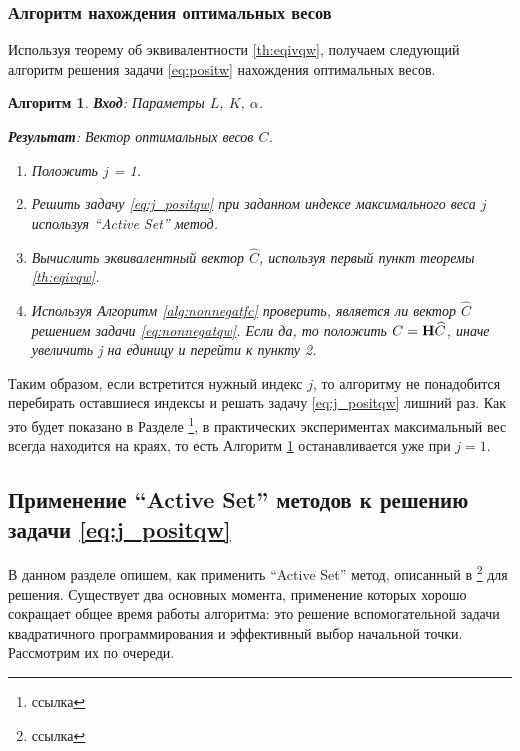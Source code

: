 \documentclass[12pt,a4paper]{article}
\newtheorem{algorithm}{Алгоритм}
\begin{document}
\subsubsection{Алгоритм нахождения оптимальных весов}
Используя теорему об эквивалентности \ref{th:eqivqw}, получаем следующий алгоритм решения задачи \eqref{eq:positw} нахождения оптимальных весов.
\begin{algorithm}
	\label{alg:solveqw}
	\textbf{Вход}: Параметры $L$, $K$, $\alpha$.
	
	\textbf{Результат}:
	Вектор оптимальных весов $C$.
	
	\begin{enumerate}
		\item Положить $j$ = 1.
		\item Решить задачу \eqref{eq:j_positqw} при заданном индексе максимального веса $j$ используя ``Active Set'' метод.
		\item Вычислить эквивалентный вектор $\widehat C$, используя первый пункт теоремы \ref{th:eqivqw}.
		\item Используя Алгоритм \ref{alg:nonnegatfc} проверить, является ли вектор $\widehat C$ решением задачи \eqref{eq:nonnegatqw}. Если да, то положить $C = \mathbf{H} \widehat C$, иначе увеличить j на единицу и перейти к пункту 2.
	\end{enumerate}
\end{algorithm}

Таким образом, если встретится нужный индекс $j$, то алгоритму не понадобится перебирать оставшиеся индексы и решать задачу \eqref{eq:j_positqw} лишний раз. Как это будет показано в Разделе \footnote{ссылка}, в практических экспериментах максимальный вес всегда находится на краях, то есть Алгоритм \ref{alg:solveqw} останавливается уже при $j = 1$.

\subsection{Применение ``Active Set'' методов к решению задачи \eqref{eq:j_positqw}}
В данном разделе опишем, как применить ``Active Set'' метод, описанный в \footnote{ссылка} для решения. Существует два основных момента, применение которых хорошо сокращает общее время работы алгоритма: это решение вспомогательной задачи квадратичного программирования и эффективный выбор начальной точки. Рассмотрим их по очереди.
\end{document}
